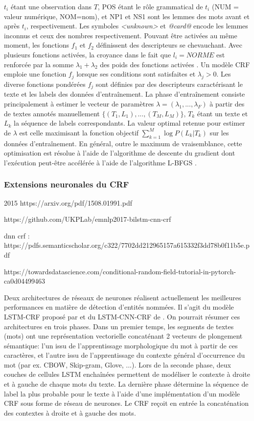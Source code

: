 $t_i$ étant une observation dans $T$, POS étant le rôle grammatical de $t_i$ (NUM = valeur numérique, NOM=nom), et NP1 et NS1 sont les lemmes des mots avant et après $t_i$, respectivement. Les symboles \textit{<unknown>} et \textit{@card@} encode les lemmes inconnus et ceux des nombres respectivement. Pouvant être activées au même moment, les fonctions $f_1$ et $f_2$ définissent des descripteurs se chevauchant. Avec plusieurs fonctions activées, la croyance dans le fait que $l_i = NORME$ est renforcée par la somme $\lambda_1 + \lambda_2$ des poids  des fonctions activées \citep{Zhu2010CRFlecture}.  Un modèle CRF emploie une fonction $f_j$ lorsque ses conditions sont satisfaites et $\lambda_j > 0$. Les diverse fonctions pondérées $f_j$ sont définies par des descripteurs caractérisant le texte et les labels des données d'entraînement. La phase d'entraînement consiste principalement à estimer le vecteur de paramètres $\lambda = (\lambda_1,...,\lambda_F)$ à partir des de textes annotés manuellement $ \lbrace (T_1, L_1), ..., (T_M, L_M) \rbrace $, $ T_k $ étant un texte et $ L_k $ la séquence de labels correspondants. La valeur optimal retenue pour estimer de $\lambda$ est celle maximisant la fonction objectif   
$\sum\limits_ {k = 1} ^ M \log P (L_k \vert T_k) $ sur les données d'entraînement. En général, outre le maximum de vraisemblance, cette optimisation est résolue à l'aide de l'algorithme de descente du gradient dont l'exécution peut-être accélérée à l'aide de l'algorithme L-BFGS \citep{liu1989l-bfgs}.

\subsubsection{Extensions neuronales du CRF}
2015 https://arxiv.org/pdf/1508.01991.pdf

https://github.com/UKPLab/emnlp2017-bilstm-cnn-crf

dnn crf : https://pdfs.semanticscholar.org/c322/7702dd212965157a615332f3dd78b0f11b5e.pdf

https://towardsdatascience.com/conditional-random-field-tutorial-in-pytorch-ca0d04499463

Deux architectures de réseaux de neurones réalisent actuellement les meilleures performances en matière de détection d'entités nommées. Il s'agit du modèle LSTM-CRF proposé par \citet{lample2016nnner} et du LSTM-CNN-CRF de \citet{ma2016lstm-cnns-crf}. On pourrait résumer ces architectures en trois phases. Dans un premier temps, les segments de textes (mots) ont une représentation vectorielle concaténant 2 vecteurs de plongement sémantique: l'un issu de l'apprentissage morphologique du mot à partir de ces caractères, et l'autre issu de l'apprentissage du contexte général d'occurrence du mot (par ex. CBOW, Skip-gram, Glove, ...). Lors de la seconde phase, deux couches de cellules LSTM enchaînées permettent de modéliser le contexte à droite et à gauche de chaque mots du texte. La dernière phase détermine la séquence de label la plus probable pour le texte à l'aide d'une implémentation d'un modèle CRF sous forme de réseau de neurones. Le CRF reçoit en entrée la concaténation des contextes à droite et à gauche des mots.

